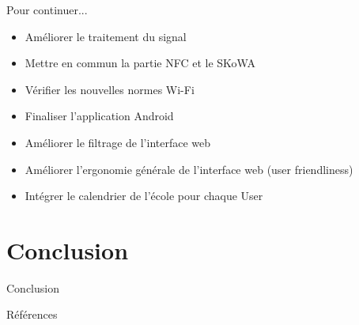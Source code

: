\documentclass[aspectratio=169]{beamer}
\begin{document}
\begin{frame}{Pour continuer...}

  \begin{itemize}
    \item Améliorer le traitement du signal
    \item Mettre en commun la partie NFC et le SKoWA
    \item Vérifier les nouvelles normes Wi-Fi
    \item Finaliser l'application Android
    \item Améliorer le filtrage de l'interface web
    \item Améliorer l'ergonomie générale de l'interface web (user friendliness)
    \item Intégrer le calendrier de l'école pour chaque User
  \end{itemize}  

\end{frame}

\section{Conclusion}

\begin{frame}{Conclusion}

\end{frame}


\begin{frame}{Références}
  \printbibliography
\end{frame}




\end{document}
